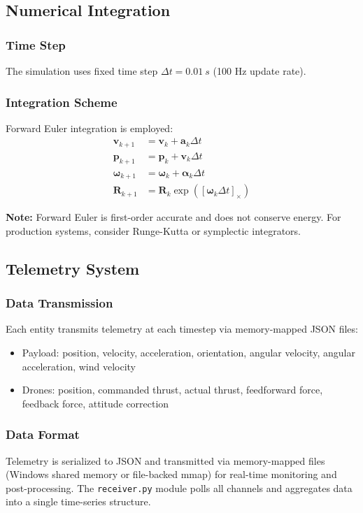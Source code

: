 \documentclass[12pt,a4paper]{article}
\begin{document}
\subsection{Numerical Integration}

\subsubsection{Time Step}
The simulation uses fixed time step $\Delta t = \SI{0.01}{s}$ (100 Hz update rate).

\subsubsection{Integration Scheme}
Forward Euler integration is employed:
\begin{align}
    \mathbf{v}_{k+1} &= \mathbf{v}_k + \mathbf{a}_k \Delta t \\
    \mathbf{p}_{k+1} &= \mathbf{p}_k + \mathbf{v}_k \Delta t \\
    \boldsymbol{\omega}_{k+1} &= \boldsymbol{\omega}_k + \boldsymbol{\alpha}_k \Delta t \\
    \mathbf{R}_{k+1} &= \mathbf{R}_k \exp([\boldsymbol{\omega}_k \Delta t]_\times)
\end{align}

\textbf{Note:} Forward Euler is first-order accurate and does not conserve energy. For production systems, consider Runge-Kutta or symplectic integrators.

\subsection{Telemetry System}

\subsubsection{Data Transmission}
Each entity transmits telemetry at each timestep via memory-mapped JSON files:
\begin{itemize}
    \item Payload: position, velocity, acceleration, orientation, angular velocity, angular acceleration, wind velocity
    \item Drones: position, commanded thrust, actual thrust, feedforward force, feedback force, attitude correction
\end{itemize}

\subsubsection{Data Format}
Telemetry is serialized to JSON and transmitted via memory-mapped files (Windows shared memory or file-backed mmap) for real-time monitoring and post-processing. The \texttt{receiver.py} module polls all channels and aggregates data into a single time-series structure.
\end{document}
